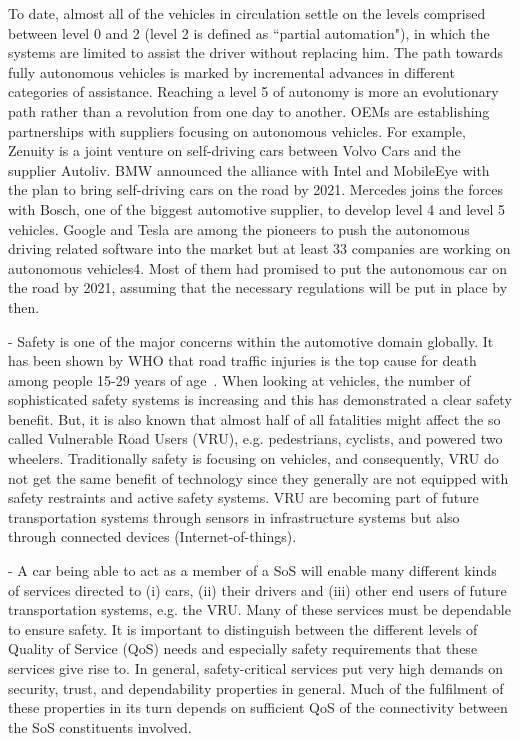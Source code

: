 To date, almost all of the
vehicles in circulation settle on the levels comprised between level 0 and 2 (level
2 is defined as ``partial automation"), in which the systems are limited to assist the
driver without replacing him.
The path towards fully autonomous vehicles
is marked by incremental advances in different categories of assistance. Reaching a
level 5 of autonomy is more an evolutionary path rather than a revolution from one
day to another.
OEMs are establishing
partnerships with suppliers focusing on autonomous vehicles. For example,
Zenuity is a joint venture on self-driving cars between Volvo Cars and the supplier
Autoliv. BMW announced the alliance with Intel and MobileEye with the plan to
bring self-driving cars on the road by 2021. Mercedes joins the forces with Bosch,
one of the biggest automotive supplier, to develop level 4 and level 5 vehicles.
Google and Tesla are among the pioneers to push the autonomous driving related
software into the market but at least 33 companies are working on autonomous
vehicles4. Most of them had promised to put the autonomous car on the road by
2021, assuming that the necessary regulations will be put in place by then.


 - Safety is one of the major concerns within the automotive domain globally. It has been shown by WHO that road traffic injuries is the top cause for death among people 15-29 years of age~\cite{WHO2015}. When looking at vehicles, the number of sophisticated safety systems is increasing and this has demonstrated a clear safety benefit. But, it is also known that almost half of all fatalities might affect the so called Vulnerable Road Users (VRU), e.g. pedestrians, cyclists, and powered two wheelers. Traditionally safety is focusing on vehicles, and consequently,  VRU do not get the same benefit of technology since they generally are not equipped with safety restraints and active safety systems. VRU are becoming part of future transportation systems through sensors in infrastructure systems but also through connected devices (Internet-of-things).

 - A car being able to act as a member of a SoS will enable many different kinds of services directed to (i) cars, (ii) their drivers and (iii) other end users of future transportation systems, e.g. the VRU. Many of these services must be dependable to ensure safety. It is important to distinguish between the different levels of Quality of Service (QoS) needs and especially safety requirements that these services give rise to. In general, safety-critical services put very high demands on security, trust, and dependability properties in general. Much of the fulfilment of these properties in its turn depends on sufficient QoS of the connectivity between the SoS constituents involved.
 

